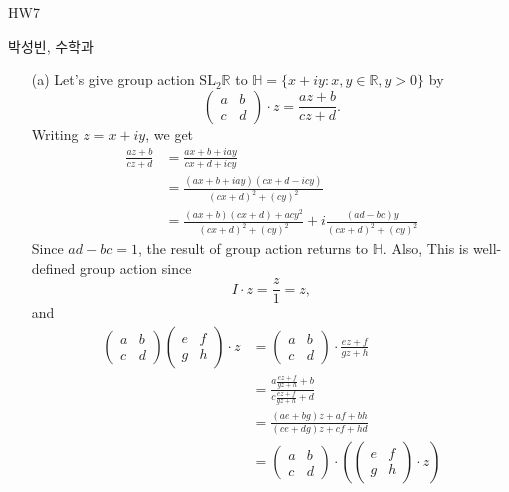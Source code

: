 \documentclass[a4paper, 12pt]{article}
\theoremstyle{Mydefinition}
\theoremstyle{Mytheorem}
\begin{document}
\thispagestyle{myfirstpage}
\begin{center}
	\Large{HW7}
\end{center}
박성빈, 수학과

\begin{enumerate}
    \item[(a)] Let's give group action $\textrm{SL}_2\mathbb{R}$ to $\mathbb{H} = \{x+iy:x,y\in \mathbb{R}, y>0\}$ by
    \begin{equation}
        \begin{pmatrix}
            a & b\\
            c & d
        \end{pmatrix}\cdot z = \frac{az+b}{cz+d}.
    \end{equation}
    Writing $z=x+iy$, we get
    \begin{equation}\label{HW6:1_2}
    \begin{split}
        \frac{az+b}{cz+d} &= \frac{ax+b+iay}{cx+d+icy}\\
        &=\frac{(ax+b+iay)(cx+d-icy)}{(cx+d)^2+(cy)^2}\\
        &=\frac{(ax+b)(cx+d)+acy^2}{(cx+d)^2+(cy)^2} + i\frac{(ad-bc)y}{(cx+d)^2+(cy)^2}
    \end{split}
    \end{equation}
    Since $ad-bc = 1$, the result of group action returns to $\mathbb{H}$. Also, This is well-defined group action since
    \begin{equation}
            I\cdot z = \frac{z}{1}=z,
    \end{equation}
    and
    \begin{equation}
        \begin{split}
            \begin{pmatrix}
            a & b\\
            c & d
        \end{pmatrix}\begin{pmatrix}
            e & f\\
            g & h
        \end{pmatrix}\cdot z &= \begin{pmatrix}
            a & b\\
            c & d
        \end{pmatrix}\cdot \frac{ez+f}{gz+h}\\
        &=\frac{a\frac{ez+f}{gz+h}+b}{c\frac{ez+f}{gz+h}+d}\\
        &=\frac{(ae+bg)z+af+bh}{(ce+dg)z+cf + hd}\\
        &=\begin{pmatrix}
            a & b\\
            c & d
        \end{pmatrix}\cdot\left(\begin{pmatrix}
            e & f\\
            g & h
        \end{pmatrix}\cdot z\right)
        \end{split}
    \end{equation}
    

\end{enumerate}
\end{document}
